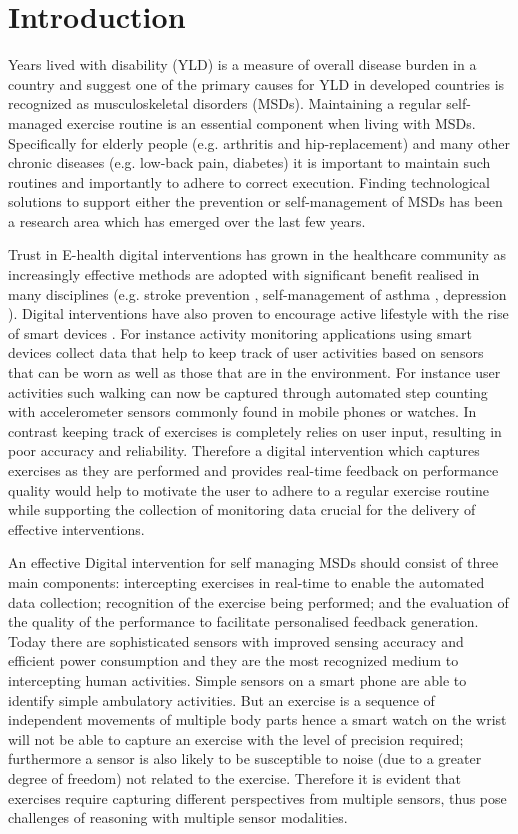 \section{Introduction}

Years lived with disability (YLD) is a measure of overall disease burden in a country and  suggest one of the primary causes for YLD in developed countries is recognized as musculoskeletal disorders (MSDs). Maintaining a regular self-managed exercise routine is an essential component when living with MSDs. Specifically for elderly people (e.g. arthritis and hip-replacement) and many other chronic diseases (e.g. low-back pain, diabetes) it is important to maintain such routines and importantly to adhere to correct execution. Finding technological solutions to support either the prevention or self-management of MSDs has been a research area which has emerged over the last few years.

Trust in E-health digital interventions has grown in the healthcare community as increasingly effective methods are adopted with significant benefit realised in many disciplines (e.g. stroke prevention \cite{widmer2015digital}, self-management of asthma \cite{mclean2016interactive}, depression \cite{li2014game}). Digital interventions have also proven to encourage active lifestyle with the rise of smart devices \cite{fanning2012increasing}. For instance activity monitoring applications using smart devices collect data that help to keep track of user activities based on sensors that can be worn as well as those that are in the environment. For instance user activities such walking can now be captured through automated step counting with accelerometer sensors commonly found in mobile phones or watches. In contrast keeping track of exercises is completely relies on user input, resulting in poor accuracy and reliability. Therefore a digital intervention which captures exercises as they are performed and provides real-time feedback on performance quality would help to motivate the user to adhere to a regular exercise routine while supporting the collection of monitoring data crucial for the delivery of effective interventions.

An effective Digital intervention for self managing MSDs should consist of three main components: intercepting exercises in real-time to enable the automated data collection;  recognition of the exercise being performed; and the evaluation of the quality of the performance to facilitate personalised feedback generation. Today there are sophisticated sensors with improved sensing accuracy and efficient power consumption and they are the most recognized medium to intercepting human activities. Simple sensors on a smart phone are able to identify simple ambulatory activities. But an exercise is a sequence of independent movements of multiple body parts hence a smart watch on the wrist will not be able to capture an exercise with the level of precision required; furthermore a sensor is also likely to be susceptible to noise (due to a greater degree of freedom) not related to the exercise. Therefore it is evident that exercises require capturing different perspectives from multiple sensors, thus pose challenges of reasoning with multiple sensor modalities. 

